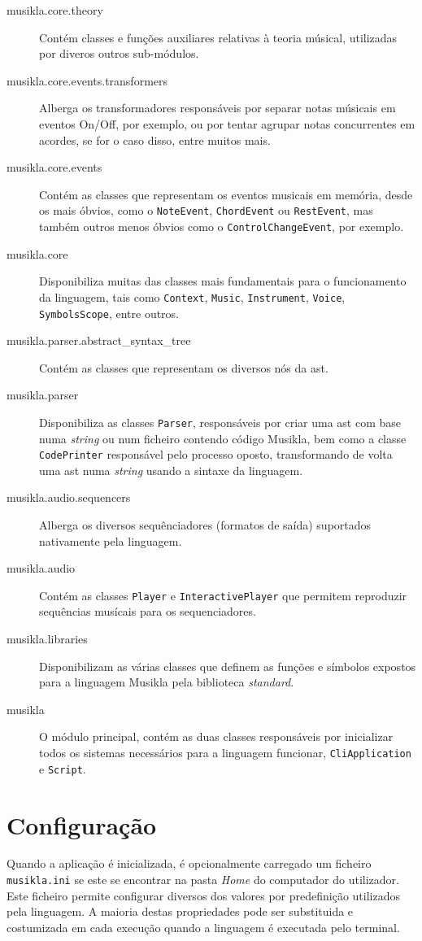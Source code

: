 \begin{description}
 \item[musikla.core.theory] Contém classes e funções auxiliares relativas à teoria músical, utilizadas por diveros outros sub-módulos.
 \item[musikla.core.events.transformers] Alberga os transformadores responsáveis por separar notas músicais em eventos On/Off, por exemplo, ou por tentar agrupar notas concurrentes em acordes, se for o caso disso, entre muitos mais.
 \item[musikla.core.events] Contém as classes que representam os eventos musicais em memória, desde os mais óbvios, como o \texttt{NoteEvent}, \texttt{ChordEvent} ou \texttt{RestEvent}, mas também outros menos óbvios como o \texttt{ControlChangeEvent}, por exemplo.
 \item[musikla.core] Disponibiliza muitas das classes mais fundamentais para o funcionamento da linguagem, tais como \texttt{Context}, \texttt{Music}, \texttt{Instrument}, \texttt{Voice}, \texttt{SymbolsScope}, entre outros.
 \item[musikla.parser.abstract\_syntax\_tree] Contém as classes que representam os diversos nós da \acrshort{ast}.
 \item[musikla.parser] Disponibiliza as classes \texttt{Parser}, responsáveis por criar uma \acrshort{ast} com base numa \textit{string} ou num ficheiro contendo código Musikla, bem como a classe \texttt{CodePrinter} responsável pelo processo oposto, transformando de volta uma \acrshort{ast} numa \textit{string} usando a sintaxe da linguagem.
 \item[musikla.audio.sequencers] Alberga os diversos sequênciadores (formatos de saída) suportados nativamente pela linguagem.
 \item[musikla.audio] Contém as classes \texttt{Player} e \texttt{InteractivePlayer} que permitem reproduzir sequências musícais para os sequenciadores.
 \item[musikla.libraries] Disponibilizam as várias classes que definem as funções e símbolos expostos para a linguagem Musikla pela biblioteca \textit{standard}.
 \item[musikla] O módulo  principal, contém as duas classes responsáveis por inicializar todos os sistemas necessários para a linguagem funcionar, \texttt{CliApplication} e \texttt{Script}.
\end{description}

\section{Configuração}
Quando a aplicação é inicializada, é opcionalmente carregado um ficheiro \texttt{musikla.ini} se este se encontrar na pasta \textit{Home} do computador do utilizador. Este ficheiro permite configurar diversos dos valores por predefinição utilizados pela linguagem. A maioria destas propriedades pode ser substituida e costumizada em cada execução quando a linguagem é executada pelo terminal.

